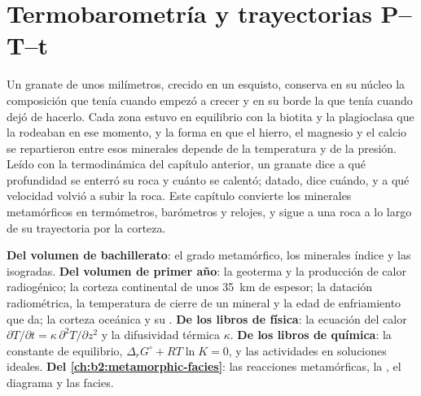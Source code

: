 \chapter{Termobarometría y trayectorias P--T--t}\label{ch:b2:pt-paths}

Un granate de unos milímetros, crecido en un esquisto, conserva en su núcleo la composición
que tenía cuando empezó a crecer y en su borde la que tenía cuando dejó de hacerlo. Cada
zona estuvo en equilibrio con la biotita y la plagioclasa que la rodeaban en ese momento, y la
forma en que el hierro, el magnesio y el calcio se repartieron entre esos minerales depende de la temperatura
y de la presión. Leído con la termodinámica del capítulo anterior, un granate dice a qué
profundidad se enterró su roca y cuánto se calentó; datado, dice cuándo, y a qué velocidad
volvió a subir la roca. Este capítulo convierte los minerales metamórficos en termómetros, barómetros
y relojes, y sigue a una roca a lo largo de su trayectoria por la corteza.

\begin{recall}
\textbf{Del volumen de bachillerato}: el grado metamórfico, los minerales índice y las isogradas.
\textbf{Del volumen de primer año}: la geoterma y la producción de calor radiogénico; la
corteza continental de unos \qty{35}{km} de espesor; la datación radiométrica, la temperatura de cierre
de un mineral y la edad de enfriamiento que da; la corteza oceánica y su .
\textbf{De los libros de física}: la ecuación del calor $\partial T/\partial t = \kappa\,
\partial^2 T/\partial z^2$ y la difusividad térmica $\kappa$. \textbf{De los libros de
química}: la constante de equilibrio, $\Delta_r G^\circ + RT\ln K = 0$, y las actividades en
soluciones ideales. \textbf{Del \cref{ch:b2:metamorphic-facies}}: las reacciones metamórficas,
la , el diagrama  y las facies.
\end{recall}


